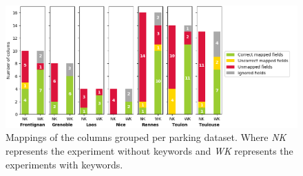 \begin{figure}
	\centering
	\includegraphics[scale=0.3]{./images/mappingPerParking1.png}
	\caption{Mappings of the columns grouped per parking dataset. Where \emph{NK} represents the 
		experiment without keywords and \emph{WK} represents the experiments with keywords.}
	\label{fig:expMappingParking}
\end{figure}






